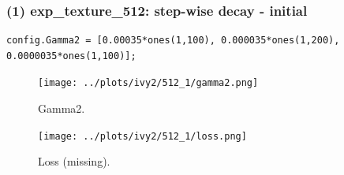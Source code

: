 \documentclass[letter]{article}
\begin{document}
\newpage

\subsubsection*{(1) exp\_texture\_512: step-wise decay - initial}

\begin{lstlisting}
config.Gamma2 = [0.00035*ones(1,100), 0.000035*ones(1,200), 0.0000035*ones(1,100)];
\end{lstlisting}

\begin{figure}[h!]
\centering
\texttt{[image: ../plots/ivy2/512\_1/gamma2.png]}
\caption{\label{fig:gamma1}Gamma2.}
\end{figure}

\begin{figure}[h!]
	\centering
	\texttt{[image: ../plots/ivy2/512\_1/loss.png]}
	\caption{\label{fig:gamma1}Loss (missing).}
\end{figure}

\newpage
\end{document}
